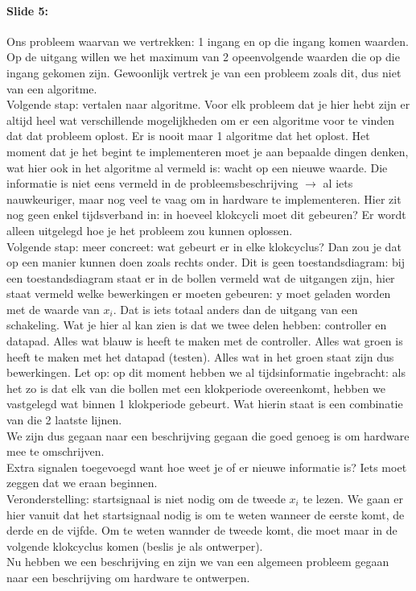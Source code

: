 \documentclass[10pt,a4paper]{book}
\begin{document}
\paragraph{Slide 5:} Ons probleem waarvan we vertrekken: 1 ingang en op die ingang komen waarden. Op de uitgang willen we het maximum van 2 opeenvolgende waarden die op die ingang gekomen zijn. Gewoonlijk vertrek je van een probleem zoals dit, dus niet van een algoritme.\\
Volgende stap: vertalen naar algoritme. Voor elk probleem dat je hier hebt zijn er altijd heel wat verschillende mogelijkheden om er een algoritme voor te vinden dat dat probleem oplost. Er is nooit maar 1 algoritme dat het oplost. Het moment dat je het begint te implementeren moet je aan bepaalde dingen denken, wat hier ook in het algoritme al vermeld is: wacht op een nieuwe waarde. Die informatie is niet eens vermeld in de probleemsbeschrijving $\rightarrow$ al iets nauwkeuriger, maar nog veel te vaag om in hardware te implementeren. Hier zit nog geen enkel tijdsverband in: in hoeveel klokcycli moet dit gebeuren? Er wordt alleen uitgelegd hoe je het probleem zou kunnen oplossen.\\
Volgende stap: meer concreet: wat gebeurt er in elke klokcyclus? Dan zou je dat op een manier kunnen doen zoals rechts onder. Dit is geen toestandsdiagram: bij een toestandsdiagram staat er in de bollen vermeld wat de uitgangen zijn, hier staat vermeld welke bewerkingen er moeten gebeuren: y moet geladen worden met de waarde van $x_i$. Dat is iets totaal anders dan de uitgang van een schakeling. Wat je hier al kan zien is dat we twee delen hebben: controller en datapad. Alles wat blauw is heeft te maken met de controller. Alles wat groen is heeft te maken met het datapad (testen). Alles wat in het groen staat zijn dus bewerkingen. Let op: op dit moment hebben we al tijdsinformatie ingebracht: als het zo is dat elk van die bollen met een klokperiode overeenkomt, hebben we vastgelegd wat binnen 1 klokperiode gebeurt. Wat hierin staat is een combinatie van die 2 laatste lijnen.\\
We zijn dus gegaan naar een beschrijving gegaan die goed genoeg is om hardware mee te omschrijven.\\
Extra signalen toegevoegd want hoe weet je of er nieuwe informatie is? Iets moet zeggen dat we eraan beginnen.\\
Veronderstelling: startsignaal is niet nodig om de tweede $x_i$ te lezen. We gaan er hier vanuit dat het startsignaal nodig is om te weten wanneer de eerste komt, de derde en de vijfde. Om te weten wannder de tweede komt, die moet maar in de volgende klokcyclus komen (beslis je als ontwerper).\\
Nu hebben we een beschrijving en zijn we van een algemeen probleem gegaan naar een beschrijving om hardware te ontwerpen.
\end{document}
